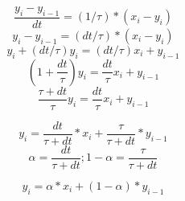 \documentclass[12pt]{article}
\begin{document}
$$\frac{y_i - y_{i-1}}{dt} = (1/\tau) * (x_i - y_i)$$
$$y_i - y_{i-1} = (dt/\tau) * (x_i - y_i)$$
$$y_i + (dt/\tau)y_i = (dt/\tau)x_i + y_{i-1}$$
$$(1 + \frac{dt}{\tau})y_i = \frac{dt}{\tau}x_i + y_{i-1}$$
$$\frac{\tau+dt}{\tau}y_i = \frac{dt}{\tau}x_i + y_{i-1} $$

$$y_i = \frac{dt}{\tau+dt}* x_i + \frac{\tau}{\tau+dt} * y_{i-1} $$
$$\alpha = \frac{dt}{\tau+dt} ;  1 - \alpha = \frac{\tau}{\tau+dt} $$


$$y_i = \alpha * x_i + (1-\alpha) * y_{i-1}$$
\end{document}
